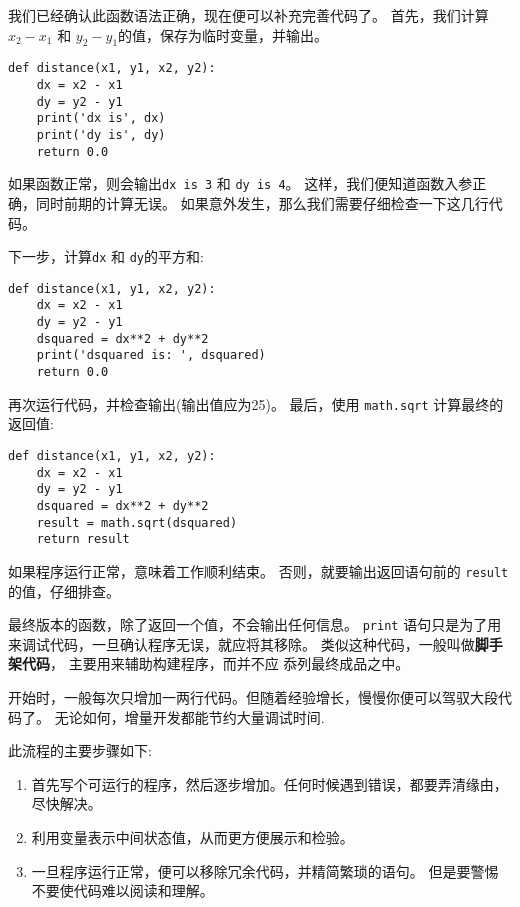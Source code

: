 \documentclass[10pt]{book}
\begin{document}
我们已经确认此函数语法正确，现在便可以补充完善代码了。
首先，我们计算$x_2 - x_1$ 和 $y_2 - y_1$的值，保存为临时变量，并输出。

\begin{verbatim}
def distance(x1, y1, x2, y2):
    dx = x2 - x1
    dy = y2 - y1
    print('dx is', dx)
    print('dy is', dy)
    return 0.0
\end{verbatim}
%
如果函数正常，则会输出\verb"dx is 3" 和 \verb"dy is 4"。
这样，我们便知道函数入参正确，同时前期的计算无误。
如果意外发生，那么我们需要仔细检查一下这几行代码。

下一步，计算{\tt dx} 和 {\tt dy}的平方和:

\begin{verbatim}
def distance(x1, y1, x2, y2):
    dx = x2 - x1
    dy = y2 - y1
    dsquared = dx**2 + dy**2
    print('dsquared is: ', dsquared)
    return 0.0
\end{verbatim}
%
再次运行代码，并检查输出(输出值应为25)。
最后，使用 {\tt math.sqrt} 计算最终的返回值:

\begin{verbatim}
def distance(x1, y1, x2, y2):
    dx = x2 - x1
    dy = y2 - y1
    dsquared = dx**2 + dy**2
    result = math.sqrt(dsquared)
    return result
\end{verbatim}
%
如果程序运行正常，意味着工作顺利结束。
否则，就要输出返回语句前的 {\tt result} 的值，仔细排查。

最终版本的函数，除了返回一个值，不会输出任何信息。
{\tt print} 语句只是为了用来调试代码，一旦确认程序无误，就应将其移除。
类似这种代码，一般叫做{\bf 脚手架代码}， 主要用来辅助构建程序，而并不应
忝列最终成品之中。

开始时，一般每次只增加一两行代码。但随着经验增长，慢慢你便可以驾驭大段代码了。
无论如何，增量开发都能节约大量调试时间.

此流程的主要步骤如下:

\begin{enumerate}

\item 首先写个可运行的程序，然后逐步增加。任何时候遇到错误，都要弄清缘由，尽快解决。

\item 利用变量表示中间状态值，从而更方便展示和检验。

\item 一旦程序运行正常，便可以移除冗余代码，并精简繁琐的语句。
但是要警惕不要使代码难以阅读和理解。

\end{enumerate}
\end{document}
